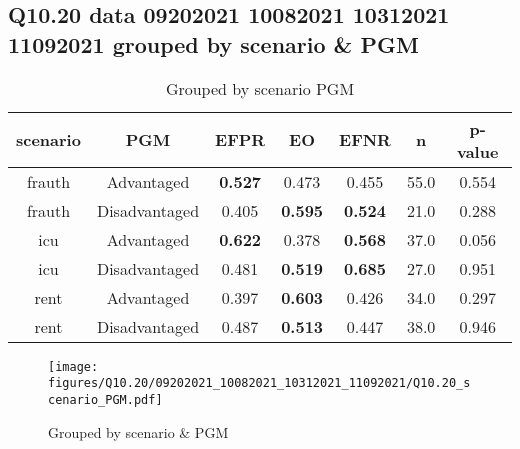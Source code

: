 \subsection{Q10.20 data 09202021 10082021 10312021 11092021 grouped by scenario \& PGM}

\begin{comment}
                             EFPR        EO      EFNR     n    pvalue
(frauth, Advantaged)     0.527273  0.472727  0.454545  55.0  0.553938
(frauth, Disadvantaged)  0.404762  0.595238  0.523810  21.0  0.287938
(icu, Advantaged)        0.621622  0.378378  0.567568  37.0  0.056030
(icu, Disadvantaged)     0.481481  0.518519  0.685185  27.0  0.950828
(rent, Advantaged)       0.397059  0.602941  0.426471  34.0  0.297320
(rent, Disadvantaged)    0.486842  0.513158  0.447368  38.0  0.946217
\end{comment}

\begin{table}[h]
    \centering
    \begin{tabular}{|c|c|c|c|c|c|c|}
        \hline
        scenario & PGM & EFPR & EO & EFNR & n & p-value\\
        \hline
        frauth & Advantaged & \textbf{0.527} & 0.473 & 0.455 & 55.0 & 0.554\\
		frauth & Disadvantaged & 0.405 & \textbf{0.595} & \textbf{0.524} & 21.0 & 0.288\\
		icu & Advantaged & \textbf{0.622} & 0.378 & \textbf{0.568} & 37.0 & 0.056\\
		icu & Disadvantaged & 0.481 & \textbf{0.519} & \textbf{0.685} & 27.0 & 0.951\\
		rent & Advantaged & 0.397 & \textbf{0.603} & 0.426 & 34.0 & 0.297\\
		rent & Disadvantaged & 0.487 & \textbf{0.513} & 0.447 & 38.0 & 0.946\\
		
        \hline
    \end{tabular}
    \caption{Grouped by scenario PGM}
    \label{tab:my_label}
\end{table}
\begin{figure}[h]
    \centering
    \texttt{[image: figures/Q10.20/09202021\_10082021\_10312021\_11092021/Q10.20\_scenario\_PGM.pdf]}
    \caption{Grouped by scenario \& PGM}
    \label{fig:my_label}
\end{figure}
